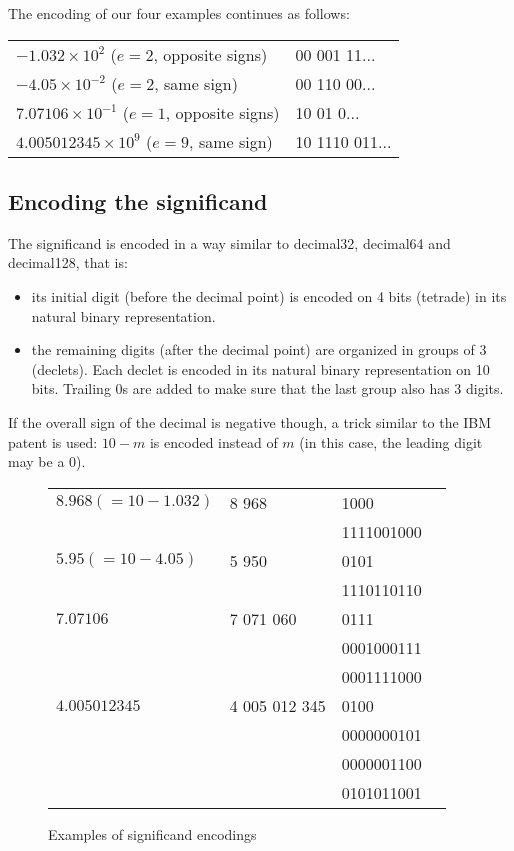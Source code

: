 \documentclass{acm_proc_article-sp}
\begin{document}
The encoding of our four examples continues as follows:

\begin{tabular}{l|l}
$- 1.032 \times 10^2$ ($e=2$, opposite signs) & 00 001 11... \\

$-4.05 \times 10^{-2}$ ($e=2$, same sign) & 00 110 00... \\

$7.07106 \times 10^{-1}$ ($e=1$, opposite signs) & 10 01 0... \\

$4.005012345 \times 10^9$ ($e=9$, same sign) & 10 1110 011...\\
\end{tabular}


\subsection{Encoding the significand}

The significand is encoded in a way similar to decimal32, decimal64 and decimal128, that is:

\begin{itemize}
\item its initial digit (before the decimal point) is encoded on 4 bits (tetrade) in its natural binary representation.
\item the remaining digits (after the decimal point) are organized in groups of 3 (declets). Each declet is encoded in its natural binary representation on 10 bits. Trailing 0s are added to make sure that the last group also has 3 digits.
\end{itemize}

If the overall sign of the decimal is negative though, a trick similar to the IBM patent is used: $10-m$ is encoded instead of $m$ (in this case, the leading digit may be a 0).

\begin{figure}
\caption{Examples of significand encodings}
\label{figure-significand-encoding}
\center
\begin{tabular}{|l|l|l|l}
\hline
$8.968 (=10-1.032)$ & 8 968 & 1000 \\
& & 1111001000 \\
\hline
$5.95 (=10-4.05)$ & 5 950 & 0101 \\
& & 1110110110\\
\hline
$7.07106$ & 7 071 060 & 0111 \\
& & 0001000111\\
& & 0001111000\\
\hline
$4.005012345$ & 4 005 012 345 & 0100 \\
& & 0000000101\\
& & 0000001100\\
& & 0101011001\\
\hline
\end{tabular}
\end{figure}
\end{document}
